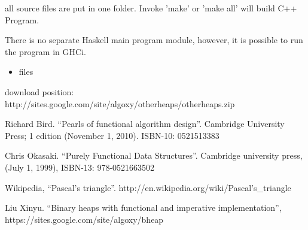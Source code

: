 \documentclass{article}
\begin{document}
all source files are put in one folder. Invoke 'make' or 'make all'
will build C++ Program. 

There is no separate Haskell main program module, however, it is possible to run the program in GHCi.

\begin{itemize}
\item files

\end{itemize}

download position: http://sites.google.com/site/algoxy/otherheaps/otherheaps.zip

\begin{thebibliography}{99}

Richard Bird. ``Pearls of functional algorithm design''. Cambridge University Press; 1 edition (November 1, 2010). ISBN-10: 0521513383

Chris Okasaki. ``Purely Functional Data Structures''. Cambridge university press, (July 1, 1999), ISBN-13: 978-0521663502

Wikipedia, ``Pascal's triangle''. http://en.wikipedia.org/wiki/Pascal's\_triangle

Liu Xinyu. ``Binary heaps with functional and imperative implementation'', https://sites.google.com/site/algoxy/bheap

\end{thebibliography}

\ifx\wholebook\relax \else
\end{document}
